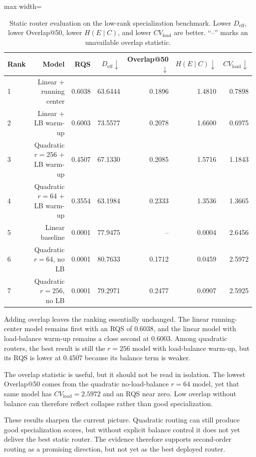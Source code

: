 \documentclass[11pt]{article}
\newcommand{\tablesize}{\footnotesize}
\begin{document}
\begin{table}[H]
\centering
\tablesize
\begin{adjustbox}{max width=\linewidth}
\begin{tabular}{lrrrrrr}
\toprule
Rank & Model & RQS & $D_{\mathrm{eff}} \downarrow$ & Overlap@50 $\downarrow$ & $H(E \mid C) \downarrow$ & $CV_{\mathrm{load}} \downarrow$ \\
\midrule
1 & Linear + running center & 0.6038 & 63.6444 & 0.1896 & 1.4810 & 0.7898 \\
2 & Linear + LB warm-up & 0.6003 & 73.5577 & 0.2078 & 1.6600 & 0.6975 \\
3 & Quadratic $r=256$ + LB warm-up & 0.4507 & 67.1330 & 0.2085 & 1.5716 & 1.1843 \\
4 & Quadratic $r=64$ + LB warm-up & 0.3554 & 63.1984 & 0.2333 & 1.3536 & 1.3665 \\
5 & Linear baseline & 0.0001 & 77.9475 & -- & 0.0004 & 2.6456 \\
6 & Quadratic $r=64$, no LB & 0.0001 & 80.7633 & 0.1712 & 0.0459 & 2.5972 \\
7 & Quadratic $r=256$, no LB & 0.0001 & 79.2971 & 0.2477 & 0.0907 & 2.5925 \\
\bottomrule
\end{tabular}
\end{adjustbox}
\caption{Static router evaluation on the low-rank specialization benchmark. Lower $D_{\mathrm{eff}}$, lower Overlap@50, lower $H(E \mid C)$, and lower $CV_{\mathrm{load}}$ are better. ``--'' marks an unavailable overlap statistic.}
\label{tab:router-rqs}
\end{table}

Adding overlap leaves the ranking essentially unchanged. The linear running-center model remains first with an RQS of 0.6038, and the linear model with load-balance warm-up remains a close second at 0.6003. Among quadratic routers, the best result is still the $r=256$ model with load-balance warm-up, but its RQS is lower at 0.4507 because its balance term is weaker.

The overlap statistic is useful, but it should not be read in isolation. The lowest Overlap@50 comes from the quadratic no-load-balance $r=64$ model, yet that same model has $CV_{\mathrm{load}}=2.5972$ and an RQS near zero. Low overlap without balance can therefore reflect collapse rather than good specialization.

These results sharpen the current picture. Quadratic routing can still produce good specialization scores, but without explicit balance control it does not yet deliver the best static router. The evidence therefore supports second-order routing as a promising direction, but not yet as the best deployed router.
\end{document}
